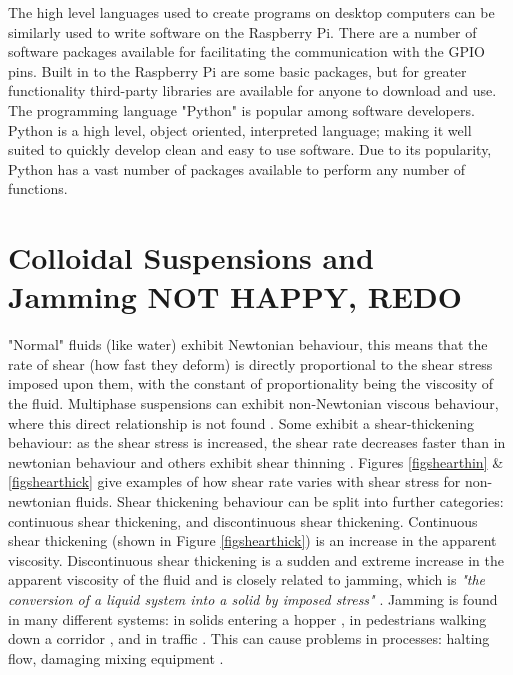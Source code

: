 \documentclass[twoside,a4]{report}
\def\br{\newline \newline \noindent}
\begin{document}
	The high level languages used to create programs on desktop computers can be similarly used to write software on the Raspberry Pi. There are a number of software packages available for facilitating the communication with the GPIO pins. Built in to the Raspberry Pi are some basic packages, but for greater functionality third-party libraries are available for anyone to download and use\cite{pilibswiringpi, pilibspigpio}. The programming language "Python" is popular among software developers. Python is a high level, object oriented, interpreted language; making it well suited to quickly develop clean and easy to use software. Due to its popularity, Python has a vast number of packages available to perform any number of functions. \br


	\section{Colloidal Suspensions and Jamming NOT HAPPY, REDO}
	"Normal" fluids (like water) exhibit Newtonian behaviour, this means that the rate of shear (how fast they deform) is directly proportional to the shear stress imposed upon them, with the constant of proportionality being the viscosity of the fluid\cite[p.~252]{schadict}. Multiphase suspensions can exhibit non-Newtonian viscous behaviour, where this direct relationship is not found \cite[p.~255-256]{schadict}. Some exhibit a shear-thickening behaviour: as the shear stress is increased, the shear rate decreases faster than in newtonian behaviour and others exhibit shear thinning \cite{backtypesofnonnewt}. Figures \ref{figshearthin} \& \ref{figshearthick} give examples of how shear rate varies with shear stress for non-newtonian fluids. Shear thickening behaviour can be split into further categories: continuous shear thickening, and discontinuous shear thickening. Continuous shear thickening (shown in Figure \ref{figshearthick})  is an increase in the apparent viscosity. Discontinuous shear thickening is a sudden and extreme increase in the apparent viscosity of the fluid and is closely related to jamming, which is \textit{"the conversion of a liquid system into a solid by imposed stress"} \cite{backhawjam}. Jamming is found in many different systems: in solids entering a hopper \cite{back2djam}, in pedestrians walking down a corridor \cite{backpedjam}, and in traffic \cite{backcarjam}. This can cause problems in processes: halting flow, damaging mixing equipment \cite{backshearjambertrand}. \newline \newline \noindent
\end{document}
